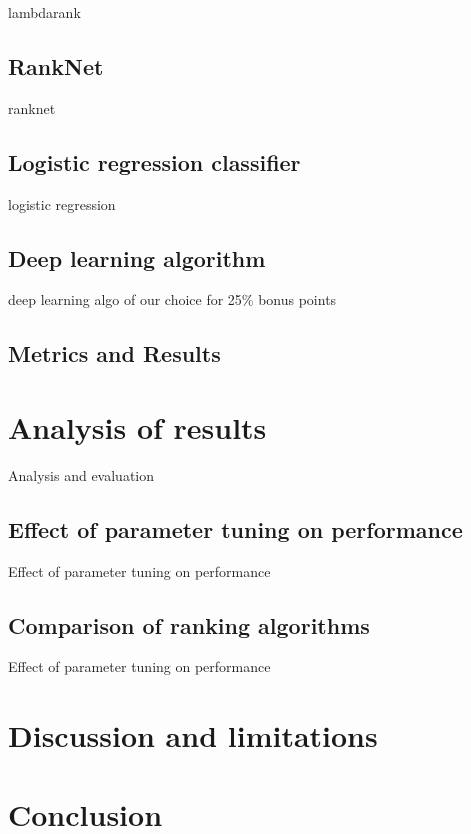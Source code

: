 \documentclass[english]{article}
\theoremstyle{definition}
\begin{document}
lambdarank

\subsection{RankNet}

ranknet

\subsection{Logistic regression classifier}

logistic regression

\subsection{Deep learning algorithm}

deep learning algo of our choice for 25\% bonus points \cite{gradclip}

\subsection{Metrics and Results}

\section{Analysis of results}

Analysis and evaluation

\subsection{Effect of parameter tuning on performance}

Effect of parameter tuning on performance

\subsection{Comparison of ranking algorithms}

Effect of parameter tuning on performance

\section{Discussion and limitations}

\section{Conclusion}

\newpage
\medskip



\end{document}
